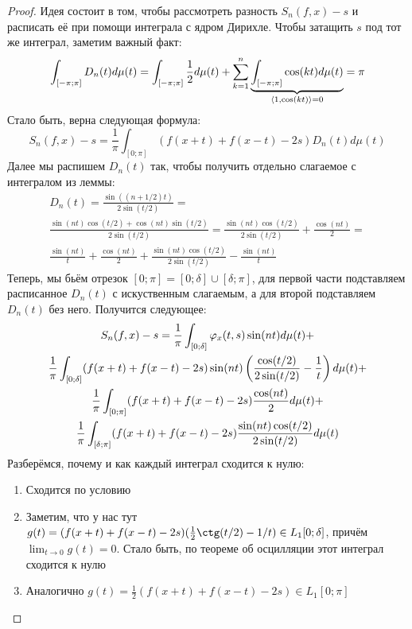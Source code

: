 \begin{proof}
	Идея состоит в том, чтобы рассмотреть разность $S_n(f, x) - s$ и расписать её при помощи интеграла с ядром Дирихле. Чтобы затащить $s$ под тот же интеграл, заметим важный факт:
	\[
		\int_{[-\pi; \pi]} D_n(t)d\mu(t) = \int_{[-\pi; \pi]} \frac{1}{2}d\mu(t) + \sum_{k = 1}^n \underbrace{\int_{[-\pi; \pi]} \cos(kt) d\mu(t)}_{\left\langle1, \cos(kt)\right\rangle = 0} = \pi
	\]
	Стало быть, верна следующая формула:
	\[
		S_n(f, x) - s = \frac{1}{\pi}\int_{[0; \pi]} (f(x + t) + f(x - t) - 2s)D_n(t)d\mu(t)
	\]
	Далее мы распишем $D_n(t)$ так, чтобы получить отдельно слагаемое с интегралом из леммы:
	\begin{multline*}
		D_n(t) = \frac{\sin((n + 1 / 2)t)}{2\sin(t / 2)} =
		\\
		\frac{\sin(nt)\cos(t / 2) + \cos(nt)\sin(t / 2)}{2\sin(t / 2)} = \frac{\sin(nt)\cos(t / 2)}{2\sin(t / 2)} + \frac{\cos(nt)}{2} =
		\\
		\frac{\sin(nt)}{t} + \frac{\cos(nt)}{2} + \frac{\sin(nt)\cos(t / 2)}{2\sin(t / 2)} - \frac{\sin(nt)}{t}
	\end{multline*}
	Теперь, мы бьём отрезок $[0; \pi] = [0; \delta] \cup [\delta; \pi]$, для первой части подставляем расписанное $D_n(t)$ с искуственным слагаемым, а для второй подставляем $D_n(t)$ без него. Получится следующее:
	\begin{multline*}
		S_n(f, x) - s = \frac{1}{\pi}\int_{[0; \delta]} \varphi_x(t, s)\sin(nt)d\mu(t) +
		\\
		\frac{1}{\pi}\int_{[0; \delta]} (f(x + t) + f(x - t) - 2s) \sin(nt) \left(\frac{\cos(t / 2)}{2\sin(t / 2)} - \frac{1}{t}\right)d\mu(t) +
		\\
		\frac{1}{\pi} \int_{[0; \pi]} (f(x + t) + f(x - t) - 2s)\frac{\cos(nt)}{2}d\mu(t) +
		\\
		\frac{1}{\pi} \int_{[\delta; \pi]} (f(x + t) + f(x - t) - 2s) \frac{\sin(nt)\cos(t / 2)}{2\sin(t / 2)}d\mu(t)
  	\end{multline*}
 	Разберёмся, почему и как каждый интеграл сходится к нулю:
 	\begin{enumerate}
 		\item Сходится по условию
 		
 		\item Заметим, что у нас тут $g(t) = (f(x + t) + f(x - t) - 2s)(\frac{1}{2}\ctg(t / 2) - 1 / t) \in L_1[0; \delta]$, причём $\lim_{t \to 0} g(t) = 0$. Стало быть, по теореме об осцилляции этот интеграл сходится к нулю
 		
 		\item Аналогично $g(t) = \frac{1}{2}(f(x + t) + f(x - t) - 2s) \in L_1[0; \pi]$
 		

\end{enumerate}
\end{proof}
